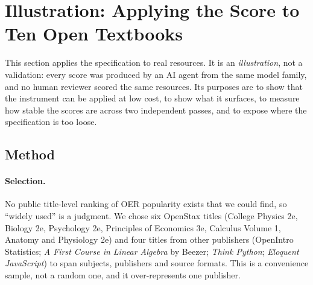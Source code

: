 \section{Illustration: Applying the Score to Ten Open Textbooks}
\label{sec:illustration}

This section applies the specification to real resources. It is an \emph{illustration}, not a validation: every score was produced by an AI agent from the same model family, and no human reviewer scored the same resources. Its purposes are to show that the instrument can be applied at low cost, to show what it surfaces, to measure how stable the scores are across two independent passes, and to expose where the specification is too loose.

\subsection{Method}
\paragraph{Selection.}
No public title-level ranking of OER popularity exists that we could find, so ``widely used'' is a judgment. We chose six OpenStax titles (College Physics 2e, Biology 2e, Psychology 2e, Principles of Economics 3e, Calculus Volume 1, Anatomy and Physiology 2e) and four titles from other publishers (OpenIntro Statistics; \emph{A First Course in Linear Algebra} by Beezer; \emph{Think Python}; \emph{Eloquent JavaScript}) to span subjects, publishers and source formats. This is a convenience sample, not a random one, and it over-represents one publisher.

